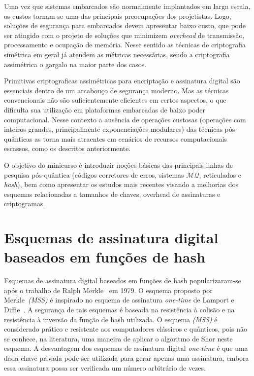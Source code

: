 \documentclass{SBCbookchapter}
\newcommand{\MQ}{\mathcal{MQ}}
\begin{document}
\begin{otherlanguage}{brazilian}
Uma vez que sistemas embarcados são normalmente implantados em larga escala, os custos tornam-se uma das principais preocupações dos projetistas. Logo, soluções de segurança para embarcados devem apresentar baixo custo, que pode ser atingido com o projeto de soluções que minimizem \emph{overhead} de transmissão, processamento e ocupação de memória. Nesse sentido as técnicas de criptografia simétrica em geral já atendem as métricas necessárias, sendo a criptografia assimétrica o gargalo na maior parte dos casos.

Primitivas criptograficas assimétricas para encriptação e assinatura digital são essenciais dentro de um 
arcabouço de segurança moderno. Mas as técnicas convencionais não são suficientemente eficientes em certos aspectos, o que dificulta sua utilização em plataformas embarcadas de baixo poder computacional. Nesse contexto a ausência de operações custosas (operações com inteiros grandes, principalmente exponenciações modulares) das técnicas pós-quânticas as torna mais atraentes em cenários de recursos computacionais escassos, como os descritos anteriormente.

O objetivo do minicurso é introduzir noções básicas das principais linhas de \\pesquisa pós-quântica (códigos corretores de erros, sistemas $\MQ$, reticulados e \emph{hash}), bem como apresentar os estudos mais recentes visando a melhorias dos esquemas relacionadas a tamanhos de chaves, overhead de assinaturas e criptogramas.


\section{Esquemas de assinatura digital baseados em funções de hash}
Esquemas de assinatura digital baseados em funções de hash popularizaram-se após o trabalho de Ralph Merkle~\cite{merkle:79} em 1979. 
O esquema proposto por Merkle~\textit{(MSS)} é inspirado no esquema de assinatura \textit{one-time} de Lamport e Diffie~\cite{lamport:79}.
A segurança de tais esquemas é baseada na resistência à colisão e na resistência à inversão da função de hash utilizada. O esquema \textit{(MSS)} é considerado prático e resistente aos computadores clássicos e quânticos, pois não se conhece, na literatura, uma maneira de aplicar o algoritmo de Shor neste esquema. A desvantagem dos esquemas de assinatura digital \textit{one-time} é que uma dada chave privada pode ser utilizada para gerar apenas uma assinatura, embora essa assinatura possa ser verificada um número arbitrário de vezes. 


\end{otherlanguage}
\end{document}
